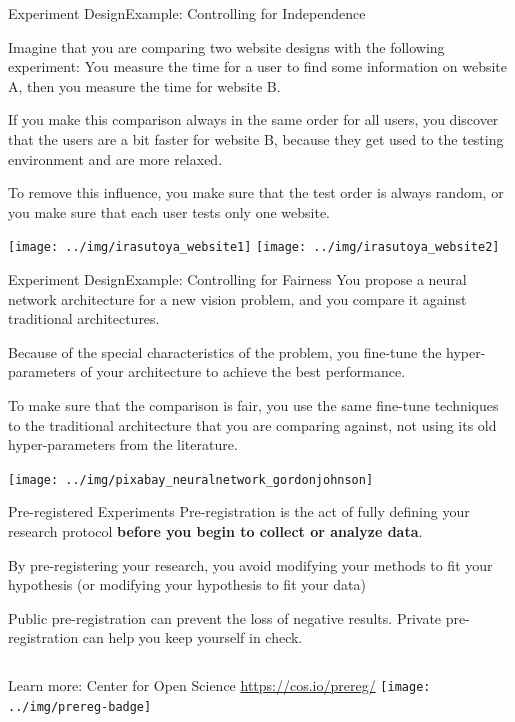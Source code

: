 \begin{frame}{Experiment Design}{Example: Controlling for Independence}
  {\smaller
  Imagine that you are comparing two website designs with the following experiment: You measure the time for a user to find some information on website A, then you measure the time for website B. \bigskip

  If you make this comparison always in the same order for all users, you discover that the users are a bit faster for website B, because they get used to the testing environment and are more relaxed. \bigskip

  To remove this influence, you make sure that the test order is always random, or you make sure that each user tests only one website.}

  \begin{center}
    \texttt{[image: ../img/irasutoya\_website1]}\hspace{1cm}
    \texttt{[image: ../img/irasutoya\_website2]}
  \end{center}
\end{frame}

\begin{frame}{Experiment Design}{Example: Controlling for Fairness}
  You propose a neural network architecture for a new vision problem, and you compare it against traditional architectures.\bigskip

  Because of the special characteristics of the problem, you fine-tune the hyper-parameters of your architecture to achieve the best performance.\bigskip

  To make sure that the comparison is fair, you use the same fine-tune techniques to the traditional architecture that you are comparing against, not using its old hyper-parameters from the literature.

  \hfill\texttt{[image: ../img/pixabay\_neuralnetwork\_gordonjohnson]}
\end{frame}

\begin{frame}{Pre-registered Experiments}
  Pre-registration is the act of fully defining your research protocol {\bf before you begin to collect or analyze data}.
  \bigskip

  By pre-registering your research, you avoid modifying your methods to fit your hypothesis (or modifying your hypothesis to fit your data)
  \bigskip

  Public pre-registration can prevent the loss of negative results. Private pre-registration can help you keep yourself in check.\bigskip

  \begin{columns}
    Learn more: Center for Open Science \url{https://cos.io/prereg/}
    \texttt{[image: ../img/prereg-badge]}
  \end{columns}
\end{frame}

